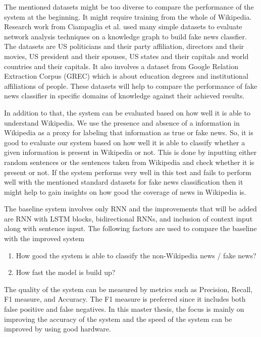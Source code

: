 \documentclass[a4paper, 11pt]{article}
\begin{document}
The mentioned datasets might be too diverse to compare the performance of the system at the beginning. It might require training from the whole of Wikipedia. Research work from Ciampaglia et al. \cite{Ciampaglia2015} used many simple datasets to evaluate network analysis techniques on a knowledge graph to build fake news classfier. The datasets are US politicians and their party affiliation, directors and their movies, US president and their spouses, US states and their capitals and world countries and their capitals. It also involves a dataset from Google Relation Extraction Corpus (GREC) which is about education degrees and institutional affiliations of people. These datasets will help to compare the performance of fake news classifier in specific domains of knowledge against their achieved results.

In addition to that, the system can be evaluated based on how well it is able to understand Wikipedia. We use the presence and absence of a information in Wikipedia as a proxy for labeling that information as true or fake news. So, it is good to evaluate our system based on how well it is able to classify whether a given information is present in Wikipedia or not. This is done by inputting either random sentences or the sentences taken from Wikipedia and check whether it is present or not. \color{red}If the system performs very well in this test and fails to perform well with the mentioned standard datasets for fake news classification then it might help to gain insights on how good the coverage of news in Wikipedia is. \color{black}

The baseline system involves only RNN and the improvements that will be added are RNN with LSTM blocks, bidirectional RNNs, and inclusion of context input along with sentence input. The following factors are used to compare the baseline with the improved system
\begin{enumerate}
\item How good the system is able to classify the non-Wikipedia news / fake news?
\item How fast the model is build up?
\end{enumerate}

The quality of the system can be measured by metrics such as Precision, Recall, F1 measure, and Accuracy. The F1 measure is preferred since it includes both false positive and false negatives. In this master thesis, the focus is mainly on improving the accuracy of the system and the speed of the system can be improved by using good hardware.
\end{document}
